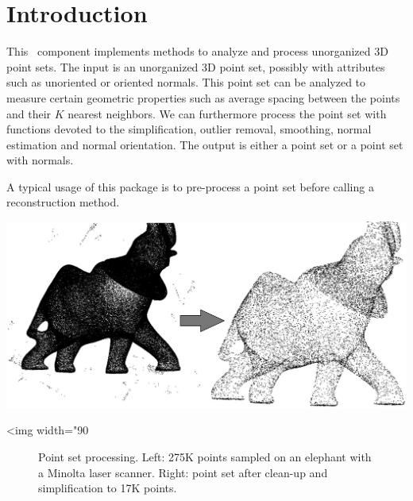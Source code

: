 \section{Introduction}


This \cgal\ component implements methods to analyze and process unorganized 3D point sets. The input is an unorganized 3D point set, possibly with attributes such as unoriented or oriented normals. This point set can be analyzed to measure certain geometric properties such as average spacing between the points and their $K$ nearest neighbors. We can furthermore process the point set with functions devoted to the simplification, outlier removal, smoothing, normal estimation and normal orientation. The output is either a point set or a point set with normals.


A typical usage of this package is to pre-process a point set before calling a reconstruction method.


\begin{center}
    \label{Point_set_processing_3-fig-introduction}
    \begin{ccTexOnly}
        \includegraphics[width=1.0\textwidth]{Point_set_processing_3/introduction} %
    \end{ccTexOnly}
    \begin{ccHtmlOnly}
        <img width="90%
    \end{ccHtmlOnly}
    \begin{figure}[h]
        \caption{Point set processing.
                 Left: 275K points sampled on an elephant with
                 a Minolta laser scanner.
                 Right: point set after clean-up and
                 simplification to 17K points.}
    \end{figure}
\end{center}



